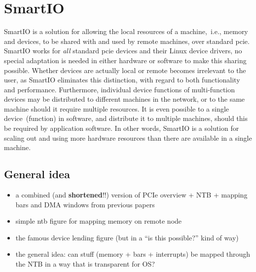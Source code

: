 \chapter{SmartIO}\label{chapter:smartio}
SmartIO is a solution for allowing the local resources of a machine,~i.e., memory and devices, to be shared with and used by remote machines, over standard \gls{pcie}.
%
SmartIO works for \emph{all} standard \gls{pcie} devices and their Linux device drivers, no special adaptation is needed in either hardware or software to make this sharing possible.
%
Whether devices are actually local or remote becomes irrelevant to the user, as SmartIO eliminates this distinction, with regard to both functionality and performance.
%
Furthermore, individual device functions of multi-function devices may be distributed to different machines in the network, or to the same machine should it require multiple resources.
%
It is even possible to  a single device~(function) in software, and distribute it to multiple machines, should this be required by application software.
%
In other words, SmartIO is a solution for scaling out and using more hardware resources than there are available in a single machine.



\section{General idea}\label{sec:idea}
\begin{itemize}
    \item a combined (and \textbf{shortened}!!) version of PCIe overview + NTB + mapping bars and DMA windows from previous papers
    \item simple ntb figure for mapping memory on remote node
    \item the famous device lending figure (but in a ``is this possible?'' kind of way)
    \item the general idea: can stuff (memory + bars + interrupts) be mapped through the NTB in a way that is transparent for OS?
\end{itemize}




